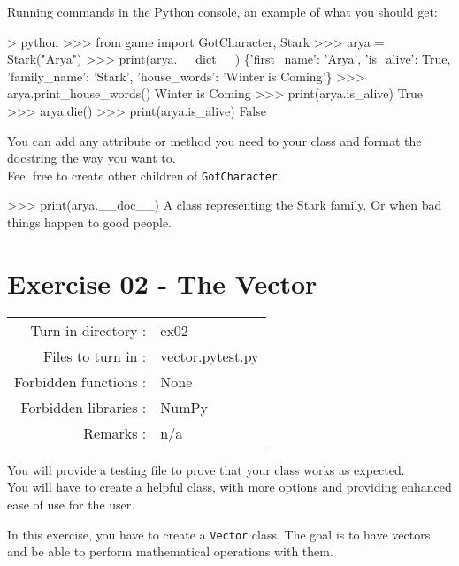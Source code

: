 \documentclass[]{article}
\newenvironment{Shaded}{\begin{snugshade}}{\end{snugshade}}
\newcommand{\NormalTok}[1]{\textcolor[rgb]{0.81,0.81,0.76}{#1}}
\begin{document}
Running commands in the Python console, an example of what you should
get:

\begin{Shaded}
\begin{Highlighting}[]
\NormalTok{> python}
\NormalTok{>>> from game import GotCharacter, Stark}
\NormalTok{>>> arya = Stark("Arya")}
\NormalTok{>>> print(arya.__dict__)}
\NormalTok{\{'first_name': 'Arya', 'is_alive': True, 'family_name': 'Stark', 'house_words': 'Winter is Coming'\}}
\NormalTok{>>> arya.print_house_words()}
\NormalTok{Winter is Coming}
\NormalTok{>>> print(arya.is_alive)}
\NormalTok{True}
\NormalTok{>>> arya.die()}
\NormalTok{>>> print(arya.is_alive)}
\NormalTok{False}
\end{Highlighting}
\end{Shaded}

You can add any attribute or method you need to your class and format
the docstring the way you want to.\\
Feel free to create other children of \texttt{GotCharacter}.

\begin{Shaded}
\begin{Highlighting}[]
\NormalTok{>>> print(arya.__doc__)}
\NormalTok{A class representing the Stark family. Or when bad things happen to good people.}
\end{Highlighting}
\end{Shaded}

\clearpage

\hypertarget{exercise-02---the-vector-1}{%
\section{Exercise 02 - The Vector}\label{exercise-02---the-vector-1}}

\begin{longtable}[]{@{}rl@{}}
\toprule
\endhead
Turn-in directory : & ex02\tabularnewline
Files to turn in : & vector.pytest.py\tabularnewline
Forbidden functions : & None\tabularnewline
Forbidden libraries : & NumPy\tabularnewline
Remarks : & n/a\tabularnewline
\bottomrule
\end{longtable}

You will provide a testing file to prove that your class works as
expected.\\
You will have to create a helpful class, with more options and providing
enhanced ease of use for the user.

In this exercise, you have to create a \texttt{Vector} class. The goal
is to have vectors and be able to perform mathematical operations with
them.
\end{document}
